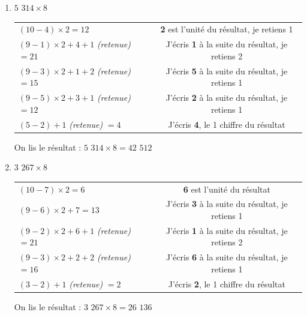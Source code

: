 \documentclass[a4paper]{article}
\begin{document}
\begin{small}
\begin{enumerate}

	\item $5$ $314 \times 8$
	
	\begin{tabular}{l|c}

		$(10 - 4) \times 2 = 12$ & \textbf{2} est l'unité du résultat, je retiens 1
		
		\tabularnewline
		
		$ (9 - 1) \times 2 + 4 + 1$ \textit{(retenue)} $= 21$ & J'écris \textbf{1} à la suite du résultat, je retiens 2
		
		\tabularnewline
		
		$ (9 - 3) \times 2 + 1 + 2$ \textit{(retenue)} $= 15$ & J'écris \textbf{5} à la suite du résultat, je retiens 1
		
		\tabularnewline
		
		$ (9 - 5) \times 2 + 3 + 1$ \textit{(retenue)} $= 12$ & J'écris \textbf{2} à la suite du résultat, je retiens 1
		
		\tabularnewline
		
		$ (5 - 2) + 1$ \textit{(retenue)} $= 4$ & J'écris \textbf{4}, le 1\up{er} chiffre du résultat

	\end{tabular}
	
	On lis le résultat : {\boldmath $5$ $314 \times 8 = 42$ $512$}\\
		
	
	
	
	
	\item $3$ $267 \times 8$
	
	\begin{tabular}{l|c}

		$(10 - 7) \times 2 = 6$ & \textbf{6} est l'unité du résultat
		
		\tabularnewline
		
		$(9 - 6) \times 2 + 7 = 13$ & J'écris \textbf{3} à la suite du résultat, je retiens 1
		
		\tabularnewline
		
		$(9 - 2) \times 2 + 6 + 1$ \textit{(retenue)} $= 21$ & J'écris \textbf{1} à la suite du résultat, je retiens 2
		
		\tabularnewline
		
		$(9 - 3) \times 2 + 2 + 2$ \textit{(retenue)} $= 16$ & J'écris \textbf{6} à la suite du résultat, je retiens 1
		
		\tabularnewline
		
		$(3 - 2) + 1$ \textit{(retenue)} $= 2$ & J'écris \textbf{2}, le 1\up{er} chiffre du résultat
		
	\end{tabular}
	
	On lis le résultat : {\boldmath $3$ $267 \times 8 = 26$ $136$}\\

\end{enumerate}
\end{small}
\end{document}
